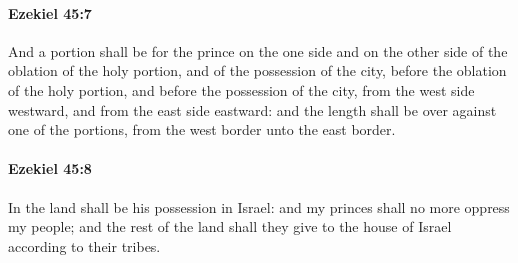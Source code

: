 		\paragraph{Ezekiel 45:7} %
			\label{EZEKIEL-45-7}

			And a portion shall be for the prince on the one side and on the other side of the oblation of the holy portion, and of the possession of the city, before the oblation of the holy portion, and before the possession of the city, from the west side westward, and from the east side eastward: and the length shall be over against one of the portions, from the west border unto the east border.


		\paragraph{Ezekiel 45:8} %
			\label{EZEKIEL-45-8}

			In the land shall be his possession in Israel: and my princes shall no more oppress my people; and the rest of the land shall they give to the house of Israel according to their tribes.

